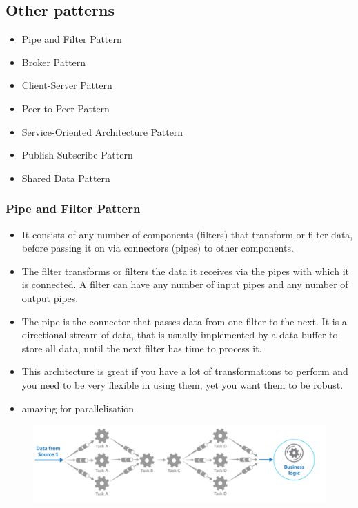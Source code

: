 \documentclass[a4paper]{article}
\begin{document}
\subsection{Other patterns}
\begin{itemize}
\item
  Pipe and Filter Pattern
\item
  Broker Pattern
\item
  Client-Server Pattern
\item
  Peer-to-Peer Pattern
\item
  Service-Oriented Architecture Pattern
\item
  Publish-Subscribe Pattern
\item
  Shared Data Pattern
\end{itemize}
\subsubsection{Pipe and Filter Pattern}
\begin{itemize}
\item  It consists of any number of components (filters) that transform or filter data, before passing it on via connectors (pipes) to other components.
\item The filter transforms or filters the data it receives via the pipes with which it is connected. A filter can have any number of input pipes and any number of output pipes.
\item The pipe is the connector that passes data from one filter to the next. It is a directional stream of data, that is usually implemented by a data buffer to store all data, until the next filter has time to process it.
\item This architecture is great if you have a lot of transformations to perform and you need to be very flexible in using them, yet you want them to be robust.
\item amazing for parallelisation 
\end{itemize}
\begin{figure}[h]
\centering 
\includegraphics[scale=0.6]{images/pnf.png}
\end{figure}
\end{document}
